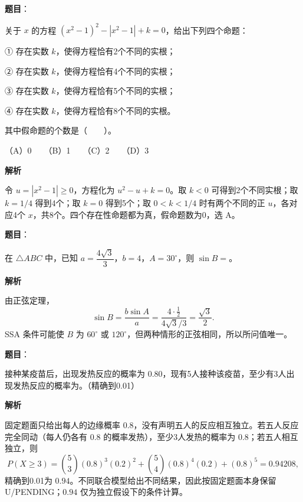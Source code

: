 \begin{answer}

\textbf{题目}：

关于 $x$ 的方程 $(x^2-1)^2-|x^2-1|+k=0$，给出下列四个命题：

① 存在实数 $k$，使得方程恰有2个不同的实根；

② 存在实数 $k$，使得方程恰有4个不同的实根；

③ 存在实数 $k$，使得方程恰有5个不同的实根；

④ 存在实数 $k$，使得方程恰有8个不同的实根。

其中假命题的个数是\mbox{（　　）}。

（A）0　　（B）1　　（C）2　　（D）3

\textbf{解析}

令 $u=|x^2-1|\geqslant0$，方程化为 $u^2-u+k=0$。取 $k<0$ 可得到2个不同实根；取 $k=1/4$ 得到4个；取 $k=0$ 得到5个；取 $0<k<1/4$ 时有两个不同的正 $u$，各对应4个 $x$，共8个。四个存在性命题都为真，假命题数为0，选 A。


\end{answer}
\begin{answer}

\textbf{题目}：

在 $\triangle ABC$ 中，已知 $a=\dfrac{4\sqrt3}{3}$，$b=4$，$A=30^\circ$，则 $\sin B=$\gkblank{}。

\textbf{解析}

由正弦定理，
\nopagebreak[4]
\[
\sin B=\frac{b\sin A}{a}
=\frac{4\cdot\frac12}{4\sqrt3/3}
=\frac{\sqrt3}{2}.
\]
SSA 条件可能使 $B$ 为 $60^\circ$ 或 $120^\circ$，但两种情形的正弦相同，所以所问值唯一。


\end{answer}
\begin{answer}

\textbf{题目}：

接种某疫苗后，出现发热反应的概率为 $0.80$，现有5人接种该疫苗，至少有3人出现发热反应的概率为\gkblank{}。（精确到0.01）

\textbf{解析}

固定题面只给出每人的边缘概率 $0.8$，没有声明五人的反应相互独立。若五人反应完全同动（每人仍各有 $0.8$ 的概率发热），至少3人发热的概率为 $0.8$；若五人相互独立，则
\nopagebreak[4]
\[
P(X\geqslant3)=\binom53(0.8)^3(0.2)^2+\binom54(0.8)^4(0.2)+(0.8)^5=0.94208,
\]
精确到0.01为 $0.94$。不同联合模型给出不同结果，因此按固定题面本身保留 U/PENDING；$0.94$ 仅为独立假设下的条件计算。


\end{answer}
